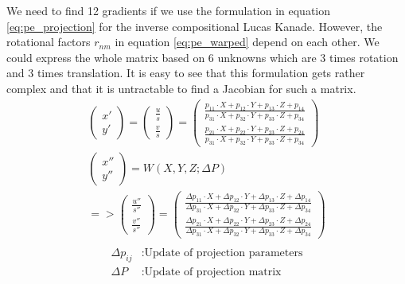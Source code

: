 \documentclass[11pt,a4paper,titlepage,oneside]{report}
\begin{document}
We need to find 12 gradients if we use the formulation in equation \ref{eq:pe_projection} for the inverse compositional Lucas Kanade. However, the rotational factors $r_{nm}$ in equation \ref{eq:pe_warped} depend on each other. We could express the whole matrix based on 6 unknowns which are 3 times rotation and 3 times translation. It is easy to see that this formulation gets rather complex and that it is untractable to find a Jacobian for such a matrix.\\
\begin{equation}\label{eq:pe_projection}
  \begin{gathered}
    \begin{pmatrix}
      x' \\
      y' 
    \end{pmatrix}=
    \begin{pmatrix}
      \frac{u}{s} \\
      \frac{v}{s} 
    \end{pmatrix}=
    \begin{pmatrix}
      \frac{p_{11} \cdot X + p_{12} \cdot Y + p_{13} \cdot Z + p_{14}}{p_{31} \cdot X + p_{32} \cdot Y + p_{33} \cdot Z + p_{34}}  \\
      \frac{p_{21} \cdot X + p_{22} \cdot Y + p_{23} \cdot Z + p_{24}}{p_{31} \cdot X + p_{32} \cdot Y + p_{33} \cdot Z + p_{34}}
    \end{pmatrix}\\
    \begin{pmatrix}
      x'' \\
      y'' 
    \end{pmatrix}=W(X,Y,Z;\Delta P)\\
    =>\begin{pmatrix}
      \frac{u''}{s''} \\
      \frac{v''}{s''} 
    \end{pmatrix}=
    \begin{pmatrix}
      \frac{\Delta p_{11} \cdot X + \Delta p_{12} \cdot Y + \Delta p_{13} \cdot Z + \Delta p_{14}}{\Delta p_{31} \cdot X + \Delta p_{32} \cdot Y + \Delta p_{33} \cdot Z + \Delta p_{34}}  \\
      \frac{\Delta p_{21} \cdot X + \Delta p_{22} \cdot Y + \Delta p_{23} \cdot Z + \Delta p_{24}}{\Delta p_{31} \cdot X + \Delta p_{32} \cdot Y + \Delta p_{33} \cdot Z + \Delta p_{34}}
    \end{pmatrix}\\
  \end{gathered}
\end{equation}
\begin{align*}
  \Delta p_{ij}   &: \text{Update of projection parameters}\\
  \Delta P        &: \text{Update of projection matrix}
\end{align*}
\end{document}
